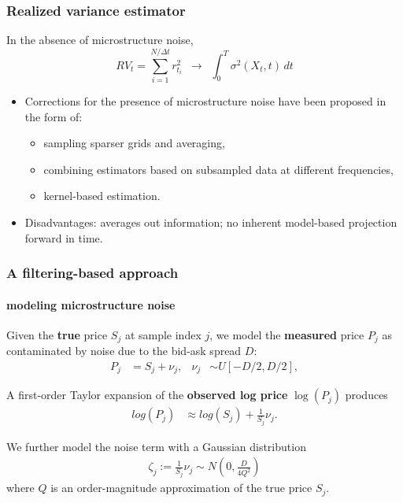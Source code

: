 \documentclass{beamer}
\begin{document}
\begin{frame}
  \frametitle{Realized variance estimator}
  In the absence of microstructure noise, 
  \[
    RV_t = \sum_{i=1}^{N/\Delta t} r_{t_i}^2 \,\,\, \to \,\,\, \displaystyle \int_{0}^T \sigma^2\left(X_t, t\right)\, dt
  \]
  
  \begin{itemize}
  \item Corrections for the presence of microstructure noise have been
    proposed in the form of:
    \begin{itemize}
    \item sampling sparser grids and averaging,
    \item combining estimators based on subsampled data at different frequencies,
    \item kernel-based estimation.
    \end{itemize}
  \item Disadvantages: averages out information; no inherent
    model-based projection forward in time.
  \end{itemize}
\end{frame}
\begin{frame}
  \frametitle{A filtering-based approach}
  \framesubtitle{modeling microstructure noise}

  Given the \textbf{true} price $S_j$ at sample index $j$, we model
  the \textbf{measured} price $P_j$ as contaminated by noise due to
  the bid-ask spread $D$:
  \begin{align*}
    P_j &= S_j + \nu_j,& \nu_j &\sim U[-D/2, D/2],
  \end{align*}

  A first-order Taylor expansion of the \textbf{observed log price} $\log(P_j)$ produces
  \begin{align*}
    log(P_j) &\approx log(S_j) + \frac{1}{S_j}\nu_j.
  \end{align*}

  We further model the noise term with a Gaussian distribution
  \begin{align*}
    \zeta_j := \frac{1}{S_j}\nu_j \sim N\left(0, \frac{D}{4Q^2} \right)
  \end{align*}
  where $Q$ is an order-magnitude approximation of the true price
  $S_j$.
\end{frame}
\end{document}
